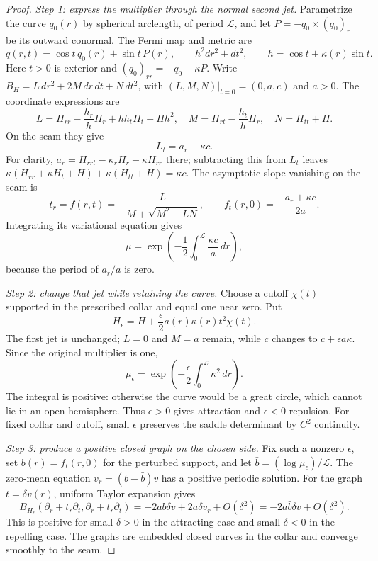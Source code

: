 \documentclass[11pt]{amsart}
\theoremstyle{definition}
\theoremstyle{remark}
\numberwithin{equation}{section}
\begin{document}
\begin{proof}
\emph{Step 1: express the multiplier through the normal second jet.}
Parametrize the curve $q_0(r)$ by spherical arclength, of period
$\mathcal L$, and let $P=-q_0\times(q_0)_r$ be its outward conormal.
The Fermi map and metric are
\[
 q(r,t)=\cos t\,q_0(r)+\sin t\,P(r),\qquad
 h^2dr^2+dt^2,\qquad h=\cos t+\kappa(r)\sin t.
\]
Here $t>0$ is exterior and $(q_0)_{rr}=-q_0-\kappa P$.
Write $B_H=L\,dr^2+2M\,dr\,dt+N\,dt^2$, with
$(L,M,N)|_{t=0}=(0,a,c)$ and $a>0$. The coordinate expressions are
\[
 L=H_{rr}-\frac{h_r}{h}H_r+hh_tH_t+Hh^2,
 \quad M=H_{rt}-\frac{h_t}{h}H_r,\quad N=H_{tt}+H.
\]
On the seam they give
\begin{equation}\label{eq:seam-derivative}
 L_t=a_r+\kappa c.
\end{equation}
For clarity, $a_r=H_{rrt}-\kappa_rH_r-\kappa H_{rr}$ there;
subtracting this from $L_t$ leaves
$\kappa(H_{rr}+\kappa H_t+H)+\kappa(H_{tt}+H)=\kappa c$.
The asymptotic slope vanishing on the seam is
\[
 t_r=f(r,t)=-\frac{L}{M+\sqrt{M^2-LN}},\qquad
 f_t(r,0)=-\frac{a_r+\kappa c}{2a}.
\]
Integrating its variational equation gives
\begin{equation}\label{eq:multiplier}
 \mu=\exp\left(-\frac12\int_0^{\mathcal L}\frac{\kappa c}{a}\,dr\right),
\end{equation}
because the period of $a_r/a$ is zero.

\emph{Step 2: change that jet while retaining the curve.}
Choose a cutoff $\chi(t)$ supported in the prescribed collar and equal
one near zero. Put
\[
 H_\epsilon=H+\frac\epsilon2a(r)\kappa(r)t^2\chi(t).
\]
The first jet is unchanged; $L=0$ and $M=a$ remain, while $c$ changes
to $c+\epsilon a\kappa$. Since the original multiplier is one,
\begin{equation}\label{eq:perturbed-multiplier}
 \mu_\epsilon=\exp\left(-\frac\epsilon2
                  \int_0^{\mathcal L}\kappa^2\,dr\right).
\end{equation}
The integral is positive: otherwise the curve would be a great circle,
which cannot lie in an open hemisphere. Thus $\epsilon>0$ gives
attraction and $\epsilon<0$ repulsion. For fixed collar and cutoff, small
$\epsilon$ preserves the saddle determinant by $C^2$ continuity.

\emph{Step 3: produce a positive closed graph on the chosen side.}
Fix such a nonzero $\epsilon$, set $b(r)=f_t(r,0)$ for the perturbed
support, and let $\bar b=(\log\mu_\epsilon)/\mathcal L$.
The zero-mean equation $v_r=(b-\bar b)v$ has a positive periodic solution.
For the graph $t=\delta v(r)$, uniform Taylor expansion gives
\[
 B_{H_\epsilon}(\partial_r+t_r\partial_t,
                       \partial_r+t_r\partial_t)
 =-2ab\delta v+2a\delta v_r+O(\delta^2)
 =-2a\bar b\delta v+O(\delta^2).
\]
This is positive for small $\delta>0$ in the attracting case and small
$\delta<0$ in the repelling case. The graphs are embedded closed curves
in the collar and converge smoothly to the seam.
\end{proof}
\end{document}
